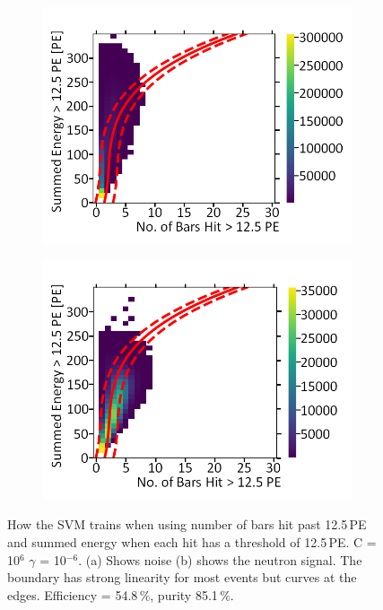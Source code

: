 \begin{figure}[!h]
\centering
\begin{subfigure}{.5\textwidth}
  \centering
  \includegraphics[width=\linewidth]{Appendix1/Figs/Bars2Sum2Noise.png}
  \captionsetup{width=.9\linewidth}
  \caption{}
  \label{subFig:Bars2Sum2N}
\end{subfigure}%
\begin{subfigure}{.5\textwidth}
  \centering
\includegraphics[width=\linewidth]{Appendix1/Figs/Bars2Sum2Signal.png}
  \captionsetup{width=.9\linewidth}
  \caption{}
  \label{subFig:Bars2Sum2S}
\end{subfigure}
\caption[LIBLINEAR SVM Nyström approximated RBF kernel for number of bars hit > 12.5\,PE vs summed energy > 12.5\,PE.]{How the SVM trains when using number of bars hit past 12.5\,PE and summed energy when each hit has a threshold of 12.5\,PE. C = 10$^6$ $\gamma$ = 10$^{-6}$. (a) Shows noise (b) shows the neutron signal. The boundary has strong linearity for most events but curves at the edges. Efficiency = 54.8\,\%, purity 85.1\,\%.}
\label{fig:Bars2Sum2SN}
\end{figure}

